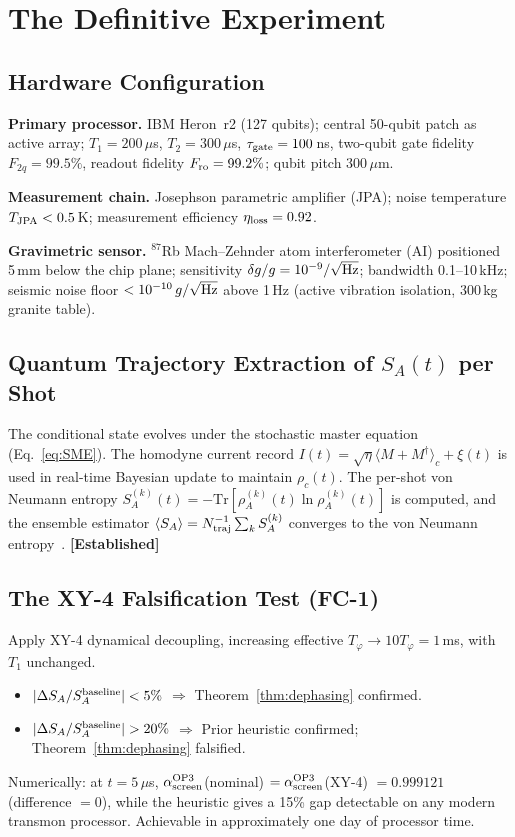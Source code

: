 \documentclass[12pt]{article}
\newcommand{\established}{\textbf{[Established]}}
\begin{document}
\section{The Definitive Experiment}
\label{sec:experiment}

\subsection{Hardware Configuration}

\textbf{Primary processor.} IBM Heron~r2 (127 qubits); central 50-qubit patch as active
array; $T_1 = 200\,\mu$s, $T_2 = 300\,\mu$s, $\tau_{\rm gate} = 100\,$ns, two-qubit gate
fidelity $F_{2q} = 99.5\%$, readout fidelity $F_{\rm ro} = 99.2\%$; qubit pitch $300\,\mu$m.

\textbf{Measurement chain.} Josephson parametric amplifier (JPA); noise temperature
$T_{\rm JPA} < 0.5\,$K; measurement efficiency $\eta_{\rm loss} = 0.92$.

\textbf{Gravimetric sensor.} $^{87}$Rb Mach--Zehnder atom interferometer (AI) positioned
5\,mm below the chip plane; sensitivity $\delta g/g = 10^{-9}/\sqrt{\rm Hz}$; bandwidth
0.1--10\,kHz; seismic noise floor $< 10^{-10}\,g/\sqrt{\rm Hz}$ above 1\,Hz (active
vibration isolation, 300\,kg granite table).

\subsection{Quantum Trajectory Extraction of $S_A(t)$ per Shot}

The conditional state evolves under the stochastic master equation (Eq.~\eqref{eq:SME}).
The homodyne current record $I(t) = \sqrt{\eta}\langle M+M^\dagger\rangle_c + \xi(t)$
is used in real-time Bayesian update to maintain $\rho_c(t)$. The per-shot von Neumann
entropy $S_A^{(k)}(t) = -\mathrm{Tr}[\rho_A^{(k)}(t)\ln\rho_A^{(k)}(t)]$ is computed,
and the ensemble estimator
$\langle S_A\rangle = N_{\rm traj}^{-1}\sum_k S_A^{(k)}$
converges to the von Neumann entropy~\cite{JacobsSteck2006}. \established

\subsection{The XY-4 Falsification Test (FC-1)}

Apply XY-4 dynamical decoupling, increasing effective $T_\varphi \to 10T_\varphi = 1\,$ms,
with $T_1$ unchanged.
\begin{itemize}
\item $|\Delta S_A/S_A^{\rm baseline}| < 5\%$ $\Rightarrow$ Theorem~\ref{thm:dephasing} confirmed.
\item $|\Delta S_A/S_A^{\rm baseline}| > 20\%$ $\Rightarrow$ Prior heuristic confirmed;
Theorem~\ref{thm:dephasing} falsified.
\end{itemize}
Numerically: at $t = 5\,\mu$s,
$\alpha_{\rm screen}^{\rm OP3}$(nominal) $= \alpha_{\rm screen}^{\rm OP3}$(XY-4) $= 0.999121$
(difference $= 0$), while the heuristic gives a 15\% gap detectable on any modern transmon
processor. Achievable in approximately one day of processor time.
\end{document}
